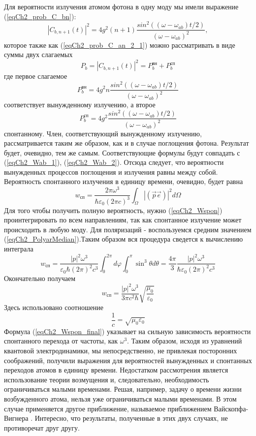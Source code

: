 Для вероятности излучения атомом фотона в одну моду мы имели выражение
(\ref{eqCh2_prob_C_bn}):
\[
\left|C_{b, n + 1}\left(t\right)\right|^2 = 4 g^2 \left(n + 1\right)
\frac{sin^2\left(\left(\omega - \omega_{ab}\right)t/2\right)}
{\left(\omega - \omega_{ab}\right)^2},
\]
которое также как (\ref{eqCh2_prob_C_an_2_1}) можно рассматривать в
виде суммы двух слагаемых
\[
P_b = \left|C_{b, n + 1}\left(t\right)\right|^2 =
P_b^{\mbox{вн}} + P_b^{\mbox{сп}}
\]
где первое слагаемое
\[
P_b^{\mbox{вн}} = 4 g^2 n
\frac{sin^2\left(\left(\omega - \omega_{ab}\right)t/2\right)}
{\left(\omega - \omega_{ab}\right)^2}
\]
соответствует вынужденному излучению, а
второе
\[
P_b^{\mbox{сп}} = 4 g^2 
\frac{sin^2\left(\left(\omega - \omega_{ab}\right)t/2\right)}
{\left(\omega - \omega_{ab}\right)^2}
\]
спонтанному. Член, соответствующий вынужденному
излучению, рассматривается таким же образом, как и в случае поглощения
фотона. Результат будет, очевидно, тем же самым. Соответствующие
формулы будут совпадать с (\ref{eqCh2_Wab_1}), 
(\ref{eqCh2_Wab_2}). Отсюда следует, что вероятности
вынужденных процессов поглощения и излучения равны между
собой. Вероятность спонтанного излучения в единицу времени, очевидно, 
будет равна 
\begin{equation}
w_{\mbox{сп}} = 
\frac{2 \pi \omega^3}
{\hbar \varepsilon_0 \left(2 \pi c\right)^3}
\int_{\Omega}
\left|\left(\vec{p} \vec{e}\right)\right|^2
d \Omega
\label{eqCh2_Wspon}
\end{equation}
Для того чтобы получить полную вероятность, нужно (\ref{eqCh2_Wspon})
проинтегрировать по всем направлениям, так как спонтанное излучение
может происходить в любую моду. Для поляризаций - воспользуемся
средним значением (\ref{eqCh2_PolyarMedian}).Таким образом вся
процедура сведется к вычислению интеграла 
\begin{equation}
w_{\mbox{сп}} = 
\frac{\left|p\right|^2 \omega^3}
{\varepsilon_0 \hbar \left(2 \pi\right)^2 c^3}
\int_{0}^{2 \pi}d \varphi \int_0^{\pi}
\sin^3 \theta d \theta
= 
\frac{4 \pi}{3}\frac{\left|p\right|^2 \omega^3}
{\hbar \varepsilon_0 \left(2 \pi\right)^2 c^3}
\end{equation}
Окончательно получаем
\begin{equation}
w_{\mbox{сп}} = 
\frac{\left|p\right|^2 \omega^3}
{3 \pi c^2 \hbar}
\sqrt{\frac{\mu_0}{\varepsilon_0}}
\label{eqCh2_Wspon_final}
\end{equation}
Здесь использовано соотношение  
\[
\frac{1}{c} = \sqrt{\mu_0 \varepsilon_0}
\]
Формула (\ref{eqCh2_Wspon_final}) указывает на сильную
зависимость вероятности спонтанного перехода от частоты, как  
$\omega^3$.  Таким
образом, исходя из уравнений квантовой электродинамики, мы
непосредственно, не привлекая посторонних соображений, получили
выражения для вероятностей вынужденных и спонтанных переходов атомов в
единицу времени. Недостатком рассмотрения является использование
теории возмущения и, следовательно, необходимость ограничиваться
малыми временами. Решая, например, задачу о времени жизни
возбужденного атома, нельзя уже ограничиваться малыми временами. В
этом случае применяется другое приближение, называемое приближением
Вайскопфа-Вигнера \cite{bLuisell1972}. Интересно, что результаты,
полученные в этих двух случаях, не противоречат друг другу.  

